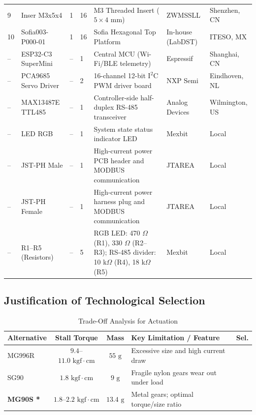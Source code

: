 \documentclass[lettersize,journal]{IEEEtran}
\begin{document}
\begin{table}[!t]
\begin{tabularx}{\columnwidth}{@{}P{0.8cm} P{2.0cm} P{0.5cm} P{0.5cm} P{2.4cm} P{1.1cm} P{0.8cm}@{}}
			9 & Inser M3x5x4 & 1 & 16 & M3 Threaded Insert ($5 \times 4$ mm) & ZWMSSLL & Shenzhen, CN \\
			10 & Sofia003-P000-01 & 1 & 16 & Sofia Hexagonal Top Platform & In-house (LabDST) & ITESO, MX \\
			\midrule
			-- & ESP32-C3 SuperMini & -- & 1 & Central MCU (Wi-Fi/BLE telemetry) & Espressif & Shanghai, CN \\
			-- & PCA9685 Servo Driver & -- & 2 & 16-channel 12-bit $\text{I}^2\text{C}$ PWM driver board & NXP Semi & Eindhoven, NL \\
			-- & MAX13487E TTL485 & -- & 1 & Controller-side half-duplex RS-485 transceiver & Analog Devices & Wilmington, US \\
			-- & LED RGB & -- & 1 & System state status indicator LED & Mexbit & Local \\
			-- & JST-PH Male & -- & 1 & High-current power PCB header and MODBUS communication & JTAREA & Local \\
			-- & JST-PH Female & -- & 1 & High-current power harness plug and MODBUS communication & JTAREA & Local \\
			-- & R1--R5 (Resistors) & -- & 5 & RGB LED: 470 $\Omega$ (R1), 330 $\Omega$ (R2--R3); RS-485 divider: 10 k$\Omega$ (R4), 18 k$\Omega$ (R5) & Mexbit & Local \\
			
			\bottomrule
		\end{tabularx}
	\end{table}
	
	\subsection{Justification of Technological Selection}
	
	\begin{table}[!t]
		\centering
		\caption{Trade-Off Analysis for Actuation}
		\label{tab:alt_actuation}
		\scriptsize
		\setlength{\tabcolsep}{2.5pt}
		\renewcommand{\arraystretch}{1.1}
		\begin{tabularx}{\columnwidth}{@{}l c c X c@{}}
			\toprule
			\textbf{Alternative} & \textbf{Stall Torque} & \textbf{Mass} & \textbf{Key Limitation / Feature} & \textbf{Sel.} \\
			\midrule
			MG996R \cite{mg996r} & $9.4$--$11.0\text{ kgf}\cdot\text{cm}$ & $55\text{ g}$ & Excessive size and high current draw & \\
			SG90 \cite{sg90} & $1.8\text{ kgf}\cdot\text{cm}$ & $9\text{ g}$ & Fragile nylon gears wear out under load & \\
			\textbf{MG90S \cite{mg90s}*} & $1.8$--$2.2\text{ kgf}\cdot\text{cm}$ & $13.4\text{ g}$ & Metal gears; optimal torque/size ratio & \checkmark \\
			\bottomrule
		\end{tabularx}
	\end{table}
	
\end{document}
